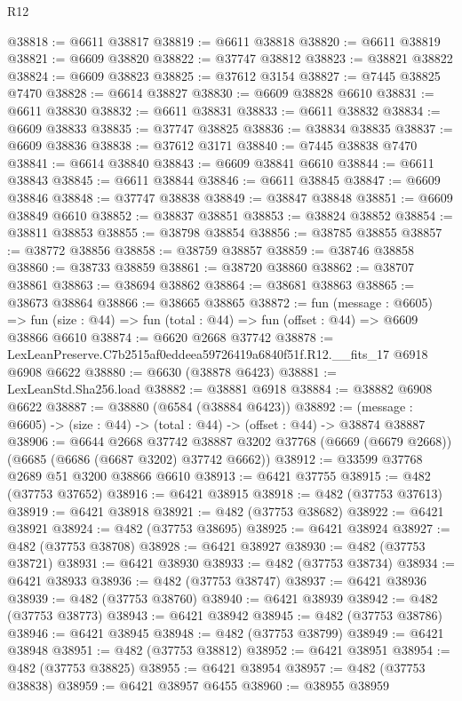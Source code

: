 \begin{lexlean}{R12}
\begin{coremodule}
@38818 := @6611 @38817
@38819 := @6611 @38818
@38820 := @6611 @38819
@38821 := @6609 @38820
@38822 := @37747 @38812
@38823 := @38821 @38822
@38824 := @6609 @38823
@38825 := @37612 @3154
@38827 := @7445 @38825 @7470
@38828 := @6614 @38827
@38830 := @6609 @38828 @6610
@38831 := @6611 @38830
@38832 := @6611 @38831
@38833 := @6611 @38832
@38834 := @6609 @38833
@38835 := @37747 @38825
@38836 := @38834 @38835
@38837 := @6609 @38836
@38838 := @37612 @3171
@38840 := @7445 @38838 @7470
@38841 := @6614 @38840
@38843 := @6609 @38841 @6610
@38844 := @6611 @38843
@38845 := @6611 @38844
@38846 := @6611 @38845
@38847 := @6609 @38846
@38848 := @37747 @38838
@38849 := @38847 @38848
@38851 := @6609 @38849 @6610
@38852 := @38837 @38851
@38853 := @38824 @38852
@38854 := @38811 @38853
@38855 := @38798 @38854
@38856 := @38785 @38855
@38857 := @38772 @38856
@38858 := @38759 @38857
@38859 := @38746 @38858
@38860 := @38733 @38859
@38861 := @38720 @38860
@38862 := @38707 @38861
@38863 := @38694 @38862
@38864 := @38681 @38863
@38865 := @38673 @38864
@38866 := @38665 @38865
@38872 := fun (message : @6605) =>
  fun (size : @44) => fun (total : @44) => fun (offset : @44) => @6609 @38866 @6610
@38874 := @6620 @2668 @37742
@38878 := LexLeanPreserve.C7b2515af0eddeea59726419a6840f51f.R12.__fits_17 @6918 @6908 @6622
@38880 := @6630 (@38878 @6423)
@38881 := LexLeanStd.Sha256.load
@38882 := @38881 @6918
@38884 := @38882 @6908 @6622
@38887 := @38880 (@6584 (@38884 @6423))
@38892 := (message : @6605) -> (size : @44) -> (total : @44) -> (offset : @44) -> @38874 @38887
@38906 := @6644
    @2668
    @37742
    @38887
    @3202
    @37768
    (@6669 (@6679 @2668))
    (@6685 (@6686 (@6687 @3202) @37742 @6662))
@38912 := @33599 @37768 @2689 @51 @3200 @38866 @6610
@38913 := @6421 @37755
@38915 := @482 (@37753 @37652)
@38916 := @6421 @38915
@38918 := @482 (@37753 @37613)
@38919 := @6421 @38918
@38921 := @482 (@37753 @38682)
@38922 := @6421 @38921
@38924 := @482 (@37753 @38695)
@38925 := @6421 @38924
@38927 := @482 (@37753 @38708)
@38928 := @6421 @38927
@38930 := @482 (@37753 @38721)
@38931 := @6421 @38930
@38933 := @482 (@37753 @38734)
@38934 := @6421 @38933
@38936 := @482 (@37753 @38747)
@38937 := @6421 @38936
@38939 := @482 (@37753 @38760)
@38940 := @6421 @38939
@38942 := @482 (@37753 @38773)
@38943 := @6421 @38942
@38945 := @482 (@37753 @38786)
@38946 := @6421 @38945
@38948 := @482 (@37753 @38799)
@38949 := @6421 @38948
@38951 := @482 (@37753 @38812)
@38952 := @6421 @38951
@38954 := @482 (@37753 @38825)
@38955 := @6421 @38954
@38957 := @482 (@37753 @38838)
@38959 := @6421 @38957 @6455
@38960 := @38955 @38959

\end{coremodule}
\end{lexlean}
